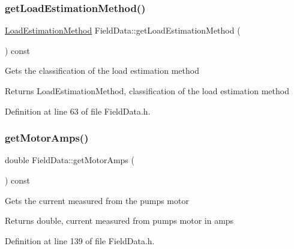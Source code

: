 \subsubsection{\texorpdfstring{get\+Load\+Estimation\+Method()}{getLoadEstimationMethod()}}
{\footnotesize\ttfamily \hyperlink{class_field_data_a424e89914ba5684c01bb269dbe3312fd}{Load\+Estimation\+Method} Field\+Data\+::get\+Load\+Estimation\+Method (\begin{DoxyParamCaption}{ }\end{DoxyParamCaption}) const\hspace{0.3cm}{\ttfamily [inline]}}

Gets the classification of the load estimation method

\begin{DoxyReturn}{Returns}
Load\+Estimation\+Method, classification of the load estimation method 
\end{DoxyReturn}


Definition at line 63 of file Field\+Data.\+h.

\mbox{\label{class_field_data_ad2b4fffb00fa7cfa6f69487e1034989a}} 
\subsubsection{\texorpdfstring{get\+Motor\+Amps()}{getMotorAmps()}}
{\footnotesize\ttfamily double Field\+Data\+::get\+Motor\+Amps (\begin{DoxyParamCaption}{ }\end{DoxyParamCaption}) const\hspace{0.3cm}{\ttfamily [inline]}}

Gets the current measured from the pump\textquotesingle{}s motor

\begin{DoxyReturn}{Returns}
double, current measured from pump\textquotesingle{}s motor in amps 
\end{DoxyReturn}


Definition at line 139 of file Field\+Data.\+h.

\mbox{\label{class_field_data_a3e8e1bf84bbd00b9b52b803147968c81}} 
